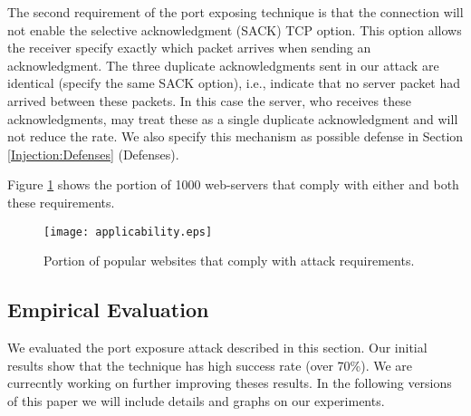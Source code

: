 \documentclass[conference]{IEEEtran}
\newcommand{\ignore}[1]{}
\begin{document}
The second requirement of the port exposing technique is that the connection will not enable the selective acknowledgment (SACK) TCP option. This option allows the receiver specify exactly which packet arrives when sending an acknowledgment. The three duplicate acknowledgments sent in our attack are identical (specify the same SACK option), i.e., indicate that no server packet had arrived between these packets. In this case the server, who receives these acknowledgments, may treat these as a single duplicate acknowledgment and will not reduce the rate. We also specify this mechanism as possible defense in Section \ref{Injection:Defenses} (Defenses).

Figure \ref{fig:sitesupport} shows the portion of 1000 web-servers that comply with either and both these requirements.

\begin{figure}
  \begin{center}
    \texttt{[image: applicability.eps]}
  \end{center}
  \caption{Portion of popular websites that comply with attack requirements.}
    \label{fig:sitesupport}
\end{figure}


\ignore{
The third requirement, is that the spoofed probe packets arrive at the client. We assume that \mal\ is capable of spoofing, and hence, that there is no spoofed packet filtering at the attacker's end. However, this attack requires that such filtering is not performed at the client's end. In particular, we require that if a firewall that filters packets by sequence number is deployed
Firewall allowing sequence numbers...
}

\subsection{Empirical Evaluation}
We evaluated the port exposure attack described in this section. Our initial results show that the technique has high success rate (over 70\%). We are currecntly working on further improving theses results. In the following versions of this paper we will include details and graphs on our experiments.
\end{document}

